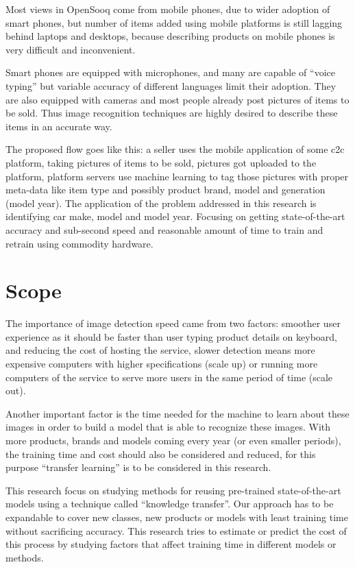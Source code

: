 Most views in OpenSooq come from mobile phones, due to wider adoption of smart phones,
but number of items added using mobile platforms is still lagging behind laptops and desktops,
because describing products on mobile phones is very difficult and inconvenient.

Smart phones are equipped with microphones, and many are capable of ``voice typing''
but variable accuracy of different languages limit their adoption.
They are also equipped with cameras and most people already post pictures of items to be sold.
Thus image recognition techniques are highly desired to describe these items in an accurate way.

The proposed flow goes like this: a seller uses the mobile application of some \gls{c2c} platform,
taking pictures of items to be sold, pictures got uploaded to the platform,
platform servers use machine learning to tag those pictures with proper meta-data like item type
and possibly product brand, model and generation (model year).
The application of the problem addressed in this research is identifying car make, model and model year.
Focusing on getting state-of-the-art accuracy and sub-second speed
and reasonable amount of time to train and retrain using commodity hardware. 

\section{Scope}

The importance of image detection speed came from two factors:
smoother user experience as it should be faster than user typing product details on keyboard,
and reducing the cost of hosting the service, slower detection means more expensive computers with
higher specifications (scale up) or running more computers of the service to serve more users in
the same period of time (scale out).

Another important factor is the time needed for the machine to learn about these images
in order to build a model that is able to recognize these images.
With more products, brands and models coming every year (or even smaller periods),
the training time and cost should also be considered and reduced,
for this purpose ``transfer learning'' is to be considered in this research.

This research focus on studying methods for reusing pre-trained state-of-the-art models 
using a technique called ``knowledge transfer''.
Our approach has to be expandable to cover new classes, new products or models
with least training time without sacrificing accuracy.
This research tries to estimate or predict the cost of this process
by studying factors that affect training time in different models or methods.

